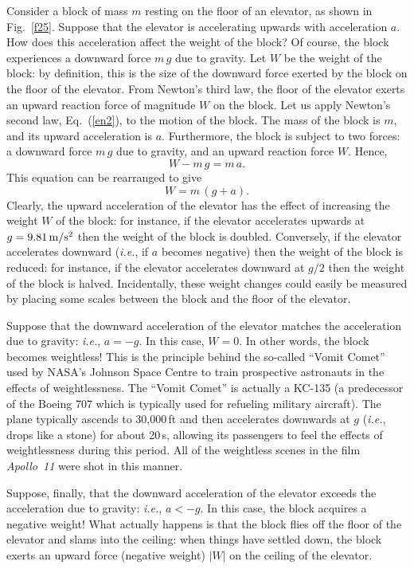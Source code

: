 Consider a block of mass $m$ resting on the floor of an elevator, as shown in Fig.~\ref{f25}. 
Suppose that the elevator is accelerating upwards with acceleration $a$. How does this
acceleration affect the weight of the block?
Of course, the block
experiences a downward force $m\,g$ due to gravity. Let $W$ be the weight of the block:
by definition, this is the size of the downward force exerted by the block on the
floor of the elevator. From Newton's third law, the floor of the elevator exerts an upward
reaction force of magnitude $W$ on the block. Let us apply Newton's
second law, Eq.~(\ref{en2}), to the motion of the block. The mass of the block is $m$,
and its upward acceleration is $a$. Furthermore, the block is subject to two forces:
a downward force $m\,g$ due to gravity, and an upward reaction force $W$. Hence,
\begin{equation}
W -m\,g = m\,a.
\end{equation}
This equation
can be rearranged to give
\begin{equation}
W = m\,(g+a).
\end{equation}
Clearly, the upward acceleration of the elevator has the effect of increasing the
weight $W$ of the block: for instance, if the elevator accelerates upwards at $g=9.81\,{\rm m/s^2}$
then the weight of the block is doubled. Conversely, if the elevator accelerates
downward ({\em i.e.}, if $a$ becomes negative) then the weight of the block
is reduced: for instance, if the elevator accelerates downward at $g/2$ then the
weight of the block is halved. Incidentally, these weight changes could easily be measured
by placing some scales between the block and the floor of the elevator.

Suppose that the downward acceleration of the elevator matches the acceleration
due to gravity: {\em i.e.}, $a=-g$. In this case, $W=0$. In other words, the
block becomes weightless! This is the principle behind the so-called
``Vomit Comet'' used by NASA's Johnson Space Centre to train prospective astronauts in
the effects of weightlessness. The ``Vomit Comet'' is actually a KC-135 (a predecessor
of the Boeing 707 which is typically used for refueling military aircraft). The plane
typically ascends to 30,000\,ft and then accelerates downwards at $g$ ({\em i.e.},
drops like a stone) for about 20\,s, allowing its passengers to feel the effects
of weightlessness during this period. All of the weightless scenes
in the film {\em Apollo~11} were shot in this manner.

Suppose, finally, that the downward acceleration of the elevator exceeds
the acceleration due to gravity: {\em i.e.}, $a<-g$. In this case, the block acquires
a negative weight! What actually happens is that the block flies off the
floor of the elevator and slams into the ceiling: when things have settled down, the
block exerts an upward force (negative weight) $|W|$ on the ceiling of the elevator.

